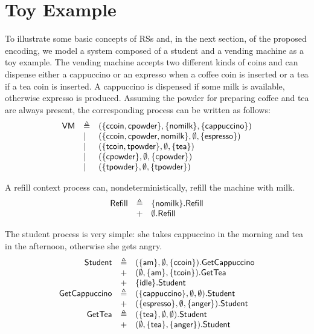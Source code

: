 
\section{Toy Example}\label{sec:student}

To illustrate some basic concepts of RSs and, in the next section, of the proposed encoding, we model a system composed of a student and a vending machine as a toy example.
The vending machine accepts two different kinds of coins and can dispense either a cappuccino or an expresso when a coffee coin is inserted or a tea if a tea coin is inserted. A cappuccino is dispensed if some milk is available, otherwise expresso is produced.
Assuming the powder for preparing coffee and tea are always present, the corresponding process can be written as follows:
\[
\begin{array}{lll}
\mathsf{VM} & \triangleq & (\{{\text{\sffamily ccoin}},{\text{\sffamily cpowder}}\},\{{\text{\sffamily nomilk}}\},\{{\text{\sffamily cappuccino}}\})\\
& | & (\{{\text{\sffamily ccoin}},{\text{\sffamily cpowder}},{\text{\sffamily nomilk}}\},\emptyset,\{{\text{\sffamily espresso}}\})\\
& | & (\{{\text{\sffamily tcoin}},{\text{\sffamily tpowder}}\},\emptyset,\{{\text{\sffamily tea}}\})\\
& | & (\{{\text{\sffamily cpowder}}\},\emptyset,\{{\text{\sffamily cpowder}}\})\\
& | & (\{{\text{\sffamily tpowder}}\},\emptyset,\{{\text{\sffamily tpowder}}\})\\
\end{array}
\]

A refill context process can, nondeterministically, refill the machine with milk.
\[
\begin{array}{lll}
\mathsf{Refill} & \triangleq & \{{\text{\sffamily nomilk}}\}.\mathsf{Refill}\\
& + & \emptyset.\mathsf{Refill}\\
\end{array}
\]

The student process is very simple: she takes cappuccino in the morning and tea in the afternoon, otherwise she gets angry.
\[
\begin{array}{rll}
\mathsf{Student} & \triangleq & (\{{\text{\sffamily am}}\},\emptyset,\{{\text{\sffamily ccoin}}\}).\mathsf{GetCappuccino}\\
& + & (\emptyset,\{{\text{\sffamily am}}\},\{{\text{\sffamily tcoin}}\}).\mathsf{GetTea}\\
& + & \{{\text{\sffamily idle}}\}.\mathsf{Student}\\
\mathsf{GetCappuccino} & \triangleq & (\{{\text{\sffamily cappuccino}}\},\emptyset,\emptyset).\mathsf{Student}\\
& + & (\{{\text{\sffamily espresso}}\},\emptyset,\{{\text{\sffamily anger}}\}).\mathsf{Student}\\
\mathsf{GetTea} & \triangleq & (\{{\text{\sffamily tea}}\},\emptyset,\emptyset).\mathsf{Student}\\
& + & (\emptyset,\{{\text{\sffamily tea}}\},\{{\text{\sffamily anger}}\}).\mathsf{Student}\\
\end{array}
\]

